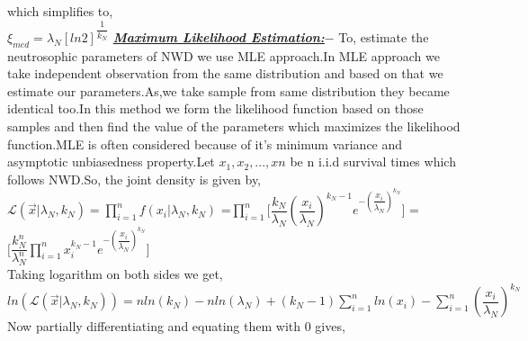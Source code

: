 \documentclass[12pt,a4paper,oneside]{article}
\begin{document}
which simplifies to,\\
\hspace*{5cm}$\boxed{\xi_{med}=\lambda_{N}[ln2]^{\dfrac{1}{k_{N}}}}$\newline\newline\newline
\textrm{\textit{\textbf{\underline{Maximum Likelihood Estimation:$-$}}}}\newline\newline
To, estimate the neutrosophic parameters of NWD we use MLE approach.In MLE approach we take independent observation from the same distribution and based on that we estimate our parameters.As,we take sample from same distribution they became identical too.In this method we form the likelihood function based on those samples and then find the value of the parameters which maximizes the likelihood function.MLE is often considered because of it's minimum variance and asymptotic unbiasedness property.Let $x_{1},x_{2},...,x{n}$ be n i.i.d survival times which follows NWD.So, the joint density is given by,\newline\newline\newline
\hspace*{5cm}$\mathscr{L}(\vec{x}|\lambda_{N},k_{N})=\prod_{i=1}^{n}f(x_{i}|\lambda_{N},k_{N})$\newline\newline
\hspace*{5cm}=$\prod_{i=1}^{n}\Biggl[\dfrac{k_{N}}{\lambda_{N}}\left(\dfrac{x_{i}}{\lambda_{N}}\right)^{k_{N}-1}e^{-\left(\dfrac{x_{i}}{\lambda_{N}}\right)^{k_{N}}}\Biggr]$\newline\newline
\hspace*{5cm}=$\Biggl[\dfrac{k_{N}^{n}}{\lambda_{N}^{n}}\prod_{i=1}^{n}x_{i}^{k_{N}-1}e^{-\left(\dfrac{x_{i}}{\lambda_{N}}\right)^{k_{N}}}\Biggr]$\\
Taking logarithm on both sides we get,\\
$ln(\mathscr{L}(\vec{x}|\lambda_{N},k_{N}))=nln(k_{N})-nln(\lambda_{N})+(k_{N}-1)\sum_{i=1}^{n}ln(x_{i})-{\sum_{i=1}^{n}\left(\dfrac{x_{i}}{\lambda_{N}}\right)^{k_{N}}}$\newline\newline\newline
Now partially differentiating and equating them with 0 gives,\newline\newline\newline
\end{document}
